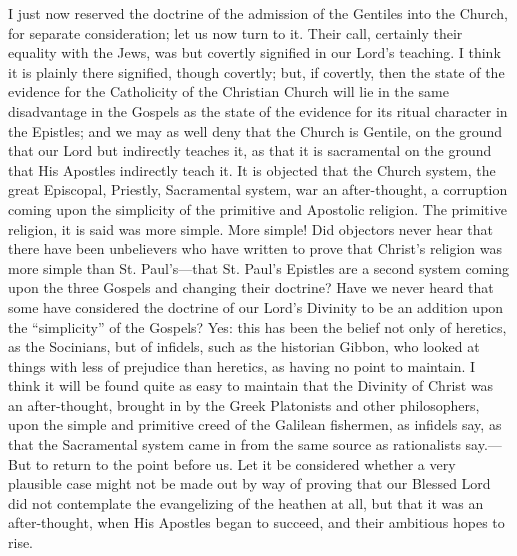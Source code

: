 I just now reserved the doctrine of the admission of the Gentiles
into the Church, for separate consideration; let us now turn to it.
Their call, certainly their equality with the Jews, was but covertly
signified in our Lord's teaching. I think it is plainly there
signified, though covertly; but, if covertly, then the state of the
evidence for the Catholicity of the Christian Church will lie in the
same disadvantage in the Gospels as the state of the evidence for its
ritual character in the Epistles; and we may as well deny that the
Church is Gentile, on the ground that our Lord but indirectly teaches
it, as that it is sacramental on the ground that His Apostles
indirectly teach it. It is objected that the Church system, the
great Episcopal, Priestly, Sacramental system, war an after-thought, a
corruption coming upon the simplicity of the primitive and Apostolic
religion. The primitive religion, it is said was more simple. More
simple! Did objectors never hear that there have been unbelievers who
have written to prove that Christ's religion was more simple than St.
Paul's—that St. Paul's Epistles are a second system coming upon the
three Gospels and changing their doctrine? Have we never heard that
some have considered the doctrine of our Lord's Divinity to be an
addition upon the ``simplicity'' of the Gospels? Yes: this has
been the belief not only of heretics, as the Socinians, but of
infidels, such as the historian Gibbon, who looked at things with less
of prejudice than heretics, as having no point to maintain. I think it
will be found quite as easy to maintain that the Divinity of Christ
was an after-thought, brought in by the Greek Platonists and other
philosophers, upon the simple and primitive creed of the Galilean
fishermen, as infidels say, as that the Sacramental system came in
from the same source as rationalists say.—But to return to the point
before us. Let it be considered whether a very plausible case might
not be made out by way of proving that our Blessed Lord did not
contemplate the evangelizing of the heathen at all, but that it was an
after-thought, when His Apostles began to succeed, and their ambitious
hopes to rise.

